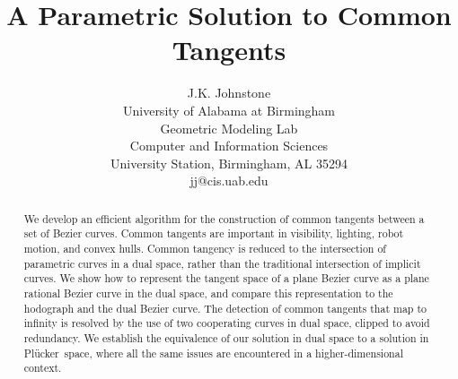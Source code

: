 \documentclass[10pt,twocolumn]{article}
\newcommand{\plucker}{Pl\"{u}cker\ }
\begin{document}
\title{A Parametric Solution to Common Tangents}

\author{J.K. Johnstone\\
	University of Alabama at Birmingham\\
	Geometric Modeling Lab\\
	Computer and Information Sciences\\
	University Station, Birmingham, AL 35294\\
	jj@cis.uab.edu\\
}

\maketitle

\begin{abstract}
We develop an efficient algorithm for the construction of common tangents
between a set of Bezier curves.
Common tangents are important in visibility, lighting, robot motion,
and convex hulls.
Common tangency is reduced to the intersection of parametric curves 
in a dual space, rather than the traditional intersection of implicit curves.
We show how to represent the tangent space of a plane Bezier curve as a 
plane rational Bezier curve in the dual space,
and compare this representation to the hodograph and the dual Bezier curve.
The detection of common tangents that map to infinity
is resolved by the use of two cooperating curves in dual space,
clipped to avoid redundancy.
We establish the equivalence of our solution in dual space to
a solution in \plucker space, where all the same issues are encountered
in a higher-dimensional context.
\end{abstract}
\end{document}
